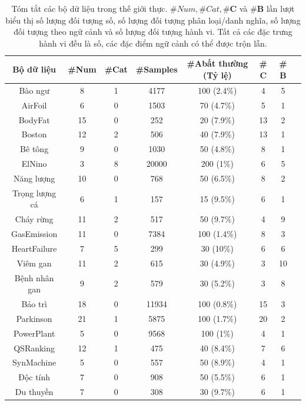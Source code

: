 \begin{table}[!htbp]
	\caption{Tóm tắt các bộ dữ liệu trong thế giới thực. $\#Num, \#Cat, \#\mathbf{C}$ và $\#\mathbf{B}$ lần lượt biểu thị số lượng đối tượng số, số lượng đối tượng phân loại/danh nghĩa, số lượng đối tượng theo ngữ cảnh và số lượng đối tượng hành vi. Tất cả các đặc trưng hành vi đều là số, các đặc điểm ngữ cảnh có thể được trộn lẫn.}
	\centering
	\begin{tabular}{cccccccc}
		\toprule
		Bộ dữ liệu & \#Num & \#Cat & \#Samples & \#Abất thường (Tỷ lệ) & \#$\mathbf{C}$ & \#$\mathbf{B}$ \\
		\midrule
		Bào ngư & 8 & 1 & 4177 & 100 (2.4\%) & 4 & 5 \\
		AirFoil & 6 & 0 & 1503 & 70 (4.7\%) & 5 & 1 \\
		BodyFat & 15 & 0 & 252 & 20 (7.9\%) & 13 & 2 \\
		Boston & 12 & 2 & 506 & 40 (7.9\%) & 13 & 1 \\
		Bê tông & 9 & 0 & 1030 & 50 (4.8\%) & 8 & 1 \\
		ElNino & 3 & 8 & 20000 & 200 (1\%) & 6 & 5 \\
		Năng lượng & 10 & 0 & 768 & 50 (6.5\%) & 8 & 2 \\
		Trọng lượng cá & 6 & 1 & 157 & 15 (9.5\%) & 6 & 1 \\
		Cháy rừng & 11 & 2 & 517 & 50 (9.7\%) & 4 & 9 \\
		GasEmission & 11 & 0 & 7384 & 100 (1.4\%) & 8 & 3 \\
		HeartFailure & 7 & 5 & 299 & 30 (10\%) & 6 & 6 \\
		Viêm gan & 11 & 2 & 615 & 30 (4.9\%) & 3 & 10 \\
		Bệnh nhân gan & 9 & 2 & 579 & 30 (5.2\%) & 3 & 8 \\
		Bảo trì & 18 & 0 & 11934 & 100 (0.8\%) & 15 & 3 \\
		Parkinson & 21 & 1 & 5875 & 100 (1.7\%) & 20 & 2 \\
        PowerPlant & 5 & 0 & 9568 & 100 (1\%) & 4 & 1 \\
		QSRanking & 12 & 1 & 475 & 40 (8.4\%) & 7 & 6 \\
		SynMachine & 5 & 0 & 557 & 50 (8.9\%) & 4 & 1 \\
		Độc tính & 7 & 0 & 908 & 50 (5.5\%) & 6 & 1 \\
		Du thuyền & 7 & 0 & 308 & 30 (9.7\%) & 6 & 1 \\
		\bottomrule
	\end{tabular}
	\label{tab:data_summary2}

\end{table}
